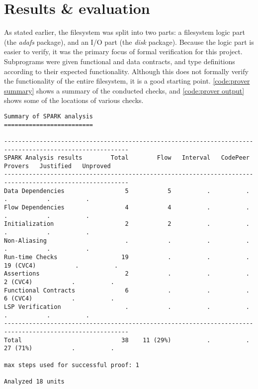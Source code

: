 \section{Results \& evaluation}
As stated earlier, the filesystem was split into two parts: a filesystem logic part (the \textit{adafs} package), and an I/O part (the \textit{disk} package).
Because the logic part is easier to verify, it was the primary focus of formal verification for this project.
Subprograms were given functional and data contracts, and type definitions according to their expected functionality.
Although this does not formally verify the functionality of the entire filesystem, it is a good starting point.
\autoref{code:prover summary} shows a summary of the conducted checks, and \autoref{code:prover output} shows some of the locations of various checks.

\begin{lstlisting}[basicstyle=\tiny, caption={Prover summary (\textnormal{gnatprove})}, label={code:prover summary}]
Summary of SPARK analysis
=========================

---------------------------------------------------------------------------------------------------------
SPARK Analysis results        Total        Flow   Interval   CodePeer      Provers   Justified   Unproved
---------------------------------------------------------------------------------------------------------
Data Dependencies                 5           5          .          .            .           .          .
Flow Dependencies                 4           4          .          .            .           .          .
Initialization                    2           2          .          .            .           .          .
Non-Aliasing                      .           .          .          .            .           .          .
Run-time Checks                  19           .          .          .    19 (CVC4)           .          .
Assertions                        2           .          .          .     2 (CVC4)           .          .
Functional Contracts              6           .          .          .     6 (CVC4)           .          .
LSP Verification                  .           .          .          .            .           .          .
---------------------------------------------------------------------------------------------------------
Total                            38    11 (29%)          .          .     27 (71%)           .          .

max steps used for successful proof: 1

Analyzed 18 units
\end{lstlisting}

